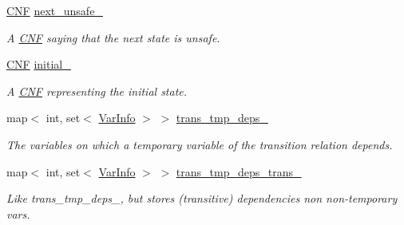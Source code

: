\begin{DoxyCompactItemize}
\hyperlink{classCNF}{C\-N\-F} \hyperlink{classAIG2CNF_a0430b9b4ff38a7b0ae339fb0abd191c9}{next\-\_\-unsafe\-\_\-}
\begin{DoxyCompactList}\small\item\em A \hyperlink{classCNF}{C\-N\-F} saying that the next state is unsafe. \end{DoxyCompactList}\item 
\hyperlink{classCNF}{C\-N\-F} \hyperlink{classAIG2CNF_a83d0b27b61d672ecf2bd007e0d473439}{initial\-\_\-}
\begin{DoxyCompactList}\small\item\em A \hyperlink{classCNF}{C\-N\-F} representing the initial state. \end{DoxyCompactList}\item 
map$<$ int, set$<$ \hyperlink{classVarInfo}{Var\-Info} $>$ $>$ \hyperlink{classAIG2CNF_a8617860055dfa8cbcc1f572676f57b84}{trans\-\_\-tmp\-\_\-deps\-\_\-}
\begin{DoxyCompactList}\small\item\em The variables on which a temporary variable of the transition relation depends. \end{DoxyCompactList}\item 
map$<$ int, set$<$ \hyperlink{classVarInfo}{Var\-Info} $>$ $>$ \hyperlink{classAIG2CNF_a7e3c2e9acc3357e837349e30447b93c3}{trans\-\_\-tmp\-\_\-deps\-\_\-trans\-\_\-}
\begin{DoxyCompactList}\small\item\em Like trans\-\_\-tmp\-\_\-deps\-\_\-, but stores (transitive) dependencies non non-\/temporary vars. \end{DoxyCompactList}\end{DoxyCompactItemize}
